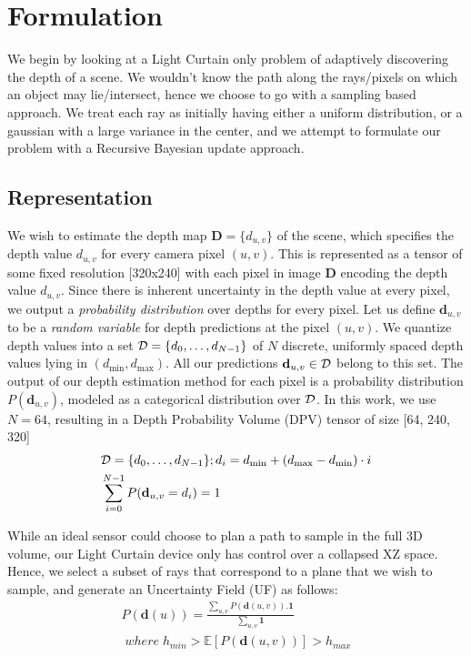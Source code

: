 
\section{Formulation}

\newcommand{\DD}{\mathbf{D}}
\newcommand{\dd}{\mathbf{d}}

We begin by looking at a Light Curtain only problem of adaptively discovering the depth of a scene. We wouldn't know the path along the rays/pixels on which an object may lie/intersect, hence we choose to go with a sampling based approach. We treat each ray as initially having either a uniform distribution, or a gaussian with a large variance in the center, and we attempt to formulate our problem with a Recursive Bayesian update approach.

\subsection{Representation}

\smallskip
We wish to estimate the depth map $\DD = \{d_{u, v}\}$ of the scene, which specifies the depth value $d_{u, v}$ for every camera pixel $(u, v)$. This is represented as a tensor of some fixed resolution [320x240] with each pixel in image $\DD$ encoding the depth value $d_{u,v}$. Since there is inherent uncertainty in the depth value at every pixel, we output a \textit{probability distribution} over depths for every pixel. Let us define $\dd_{u,v}$ to be a \textit{random variable} for depth predictions at the pixel $(u, v)$. We quantize depth values into a set $\mathcal{D} = \{d_0, \dots, d_{N-1}\}$ of $N$ discrete, uniformly spaced depth values lying in $(d_\text{min}, d_\text{max})$. All our predictions $\dd_{u, v} \in \D$ belong to this set. The output of our depth estimation method for each pixel is a probability distribution $P(\dd_{u, v})$, modeled as a categorical distribution over $\mathcal{D}$. In this work, we use $N=64$, resulting in a Depth Probability Volume (DPV) tensor of size [64, 240, 320]
\begin{align}
   &\D=\{d_0, \dots, d_{N-1}\}; d_{i}=d_\text{min}+(d_\text{max}-d_\text{min}) \cdot i 
   \label{eq:d_candi}
   \\
   &\sum_{i=0}^{N-1} P(\dd_{u,v} = d_i) =1
   \label{eq:depth_dist}
\end{align}

While an ideal sensor could choose to plan a path to sample in the full 3D volume, our Light Curtain device only has control over a collapsed XZ  space. Hence, we select a subset of rays that correspond to a plane that we wish to sample, and generate an Uncertainty Field (UF) as follows:
\begin{align}
   P(\mathbf{d}(u))=\frac{\sum_{u,v}P(\mathbf{d}{(u,v)}).\boldsymbol{1}}{\sum_{u,v}\boldsymbol{1}}
   \nonumber \\
   \;where\;h_{min}>\mathbb{E}[P(\mathbf{d}(u,v))]>h_{max}
   \label{eq:collapse}
\end{align}

